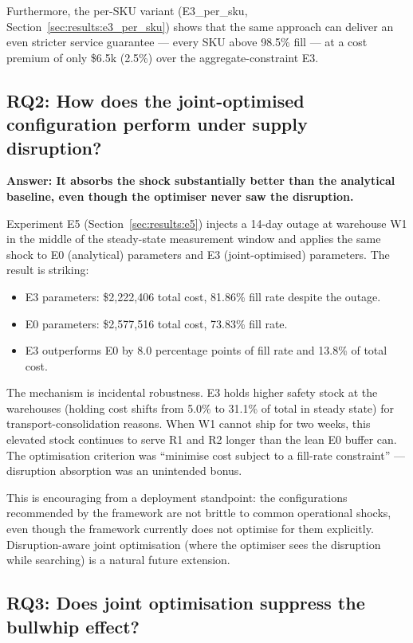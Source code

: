 Furthermore, the per-SKU variant (E3\_per\_sku,
Section~\ref{sec:results:e3_per_sku}) shows that the same approach
can deliver an even stricter service guarantee — every SKU above 98.5\%
fill — at a cost premium of only \$6.5k (2.5\%) over the
aggregate-constraint E3.

\subsection{RQ2: How does the joint-optimised configuration perform
under supply disruption?}
\label{sec:disc:rq2}

\textbf{Answer: It absorbs the shock substantially better than the
analytical baseline, even though the optimiser never saw the
disruption.}

Experiment E5 (Section~\ref{sec:results:e5}) injects a 14-day outage at
warehouse W1 in the middle of the steady-state measurement window and
applies the same shock to E0 (analytical) parameters and E3
(joint-optimised) parameters.  The result is striking:

\begin{itemize}
  \item E3 parameters: \$2,222,406 total cost, 81.86\% fill rate
        despite the outage.
  \item E0 parameters: \$2,577,516 total cost, 73.83\% fill rate.
  \item E3 outperforms E0 by 8.0 percentage points of fill rate and
        13.8\% of total cost.
\end{itemize}

The mechanism is incidental robustness.  E3 holds higher safety stock
at the warehouses (holding cost shifts from 5.0\% to 31.1\% of total
in steady state) for transport-consolidation reasons.  When W1 cannot
ship for two weeks, this elevated stock continues to serve R1 and R2
longer than the lean E0 buffer can.  The optimisation criterion was
``minimise cost subject to a fill-rate constraint'' — disruption
absorption was an unintended bonus.

This is encouraging from a deployment standpoint: the configurations
recommended by the framework are not brittle to common operational
shocks, even though the framework currently does not optimise for them
explicitly.  Disruption-aware joint optimisation (where the optimiser
sees the disruption while searching) is a natural future extension.

\subsection{RQ3: Does joint optimisation suppress the bullwhip effect?}

